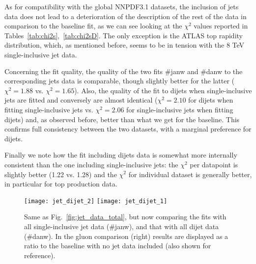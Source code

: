 %
As for compatibility with the global NNPDF3.1 datasets, the inclusion of jets data does not lead to a deterioration
of the description of the rest of the data in comparison to the baseline fit, as we can see looking at the $\chi^2$
values reported in Tables~\ref{tab:chi2s},~\ref{tab:chi2sD}.
The only exception is the ATLAS top rapidity distribution, which, as mentioned before,
seems to be in tension with the 8 TeV single-inclusive jet data.

%
Concerning the fit quality, the quality of the two fits \#janw and \#danw to the corresponding jets data is comparable,
though slightly better for the latter ($\chi^2=1.88$ vs. $\chi^2=1.65$). Also, the quality of the fit to dijets 
when single-inclusive jets are fitted and conversely are almost identical ($\chi^2=2.10$ for dijets when fitting
single-inclusive jets vs. $\chi^2=2.06$ for single-inclusive jets when fitting dijets) and, as observed before,
better than what we get for the baseline.
This confirms full consistency between the two datasets, with a marginal preference for dijets.

%
Finally we note how the fit including dijets data is somewhat more internally consistent than the one including
single-inclusive jets: the $\chi^2$ per datapoint is slightly better (1.22 vs. 1.28) and the $\chi^2$ for individual
dataset is generally better, in particular for top production data.

\begin{figure}[!t]
    \centering
    \texttt{[image: jet\_dijet\_2]}
    \texttt{[image: jet\_dijet\_1]}\\
    \caption{Same as Fig.~\ref{fig:jet_data_total}, but now comparing the
      fits with  all single-inclusive jet data (\#janw), and that with all
      dijet data (\#danw).
      In the gluon comparison (right) results are
      displayed as a ratio to the baseline with no jet data included (also
      shown for reference).}
    \label{fig:jet_dijet_1}
\end{figure}

